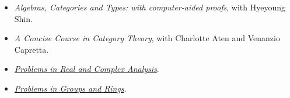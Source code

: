 \documentclass[12pt]{article}
\begin{document}
    \begin{itemize}
      \item[] \textsl{Algebras, Categories and Types: with computer-aided proofs}, with Hyeyoung Shin.

     \item[] \textsl{A Concise Course in Category Theory}, with Charlotte Aten and Venanzio Capretta.


     \item[] \href{http://www.math.hawaii.edu/~williamdemeo/PSRCA.html}{\it Problems in Real and Complex Analysis}.

     \item[] \href{http://www.math.hawaii.edu/~williamdemeo/PSRCA.html}{\it Problems in Groups and Rings}.

   \end{itemize}








\end{document}
